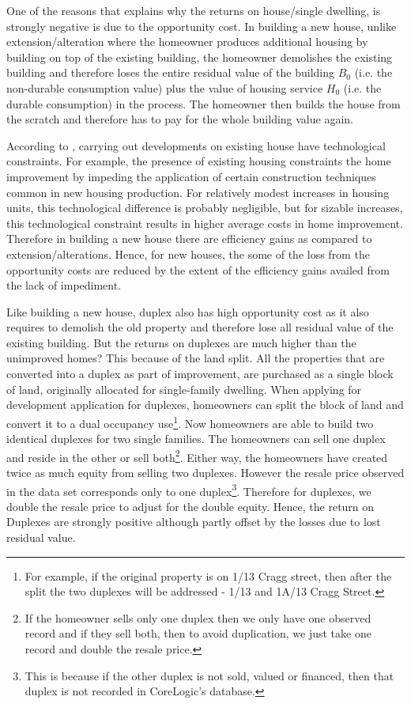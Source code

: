 \documentclass[AEJ,reqno, draftmode]{AEA} %
\begin{document}
One of the reasons that explains why the returns on house/single dwelling, is strongly negative is due to the opportunity cost. In building a new house, unlike extension/alteration where the homeowner produces additional housing by building on top of the existing building, the homeowner demolishes the existing building and therefore loses the entire residual value of the building $B_0$ (i.e. the non-durable consumption value) plus the value of housing service $H_0$ (i.e. the durable consumption) in the process. The homeowner then builds the house from the scratch and therefore has to pay for the whole building value again.

According to \citet{potepan1989interest}, carrying out developments on existing house have technological constraints. For example, the presence of existing housing constraints the home improvement by impeding the application of certain construction techniques common in new housing production. For relatively modest increases in housing units, this technological difference is probably negligible, but for sizable increases, this technological constraint results in higher average costs in home improvement. Therefore in building a new house there are efficiency gains as compared to extension/alterations. Hence, for new houses, the some of the loss from the opportunity costs are reduced by the extent of the efficiency gains availed from the lack of impediment.

Like building a new house, duplex also has high opportunity cost as it also requires to demolish the old property and therefore lose all residual value of the existing building. But the returns on duplexes are much higher than the unimproved homes? This because of the land split. All the properties that are converted into a duplex as part of improvement, are purchased as a single block of land, originally allocated for single-family dwelling. When applying for development application for duplexes, homeowners can split the block of land and convert it to a dual occupancy use\footnote{For example, if the original property is on 1/13 Cragg street, then after the split the two duplexes will be addressed - 1/13 and 1A/13 Cragg Street.}. Now homeowners are able to build two identical duplexes for two single families. The homeowners can sell one duplex and reside in the other or sell both\footnote{If the homeowner sells only one duplex then we only have one observed record and if they sell both, then to avoid duplication, we just take one record and double the resale price.}.  Either way, the homeowners have created twice as much equity from selling two duplexes. However the resale price observed in the data set corresponds only to one duplex\footnote{This is because if the other duplex is not sold, valued or financed, then that duplex is not recorded in CoreLogic's database.}. Therefore for duplexes, we double the resale price to adjust for the double equity. Hence, the return on Duplexes are strongly positive although partly offset by the losses due to lost residual value.
\end{document}
